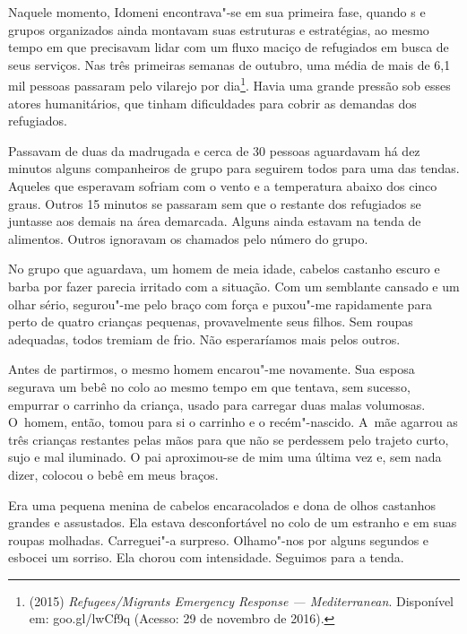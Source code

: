 Naquele momento, Idomeni encontrava"-se em sua primeira fase, quando s
e grupos organizados ainda montavam suas estruturas e estratégias, ao
mesmo tempo em que precisavam lidar com um fluxo maciço de refugiados em
busca de seus serviços. Nas três primeiras semanas de outubro, uma média
de mais de 6,1 mil pessoas passaram pelo vilarejo por
dia\footnote{  (2015) \emph{Refugees/Migrants Emergency
Response --- Mediterranean}. Disponível em:
goo.gl/lwCf9q (Acesso: 29 de
novembro de 2016).}. Havia uma grande pressão sob esses atores
humanitários, que tinham dificuldades para cobrir as demandas dos
refugiados.

Passavam de duas da madrugada e cerca de 30 pessoas aguardavam há dez
minutos alguns companheiros de grupo para seguirem todos para uma 
das tendas. Aqueles que esperavam sofriam com o vento e a
temperatura abaixo dos cinco graus. Outros 15 minutos se passaram sem
que o restante dos refugiados se juntasse aos demais na área demarcada.
Alguns ainda estavam na tenda de alimentos. Outros ignoravam os chamados
pelo número do grupo.

No grupo que aguardava, um homem de meia idade, cabelos castanho escuro
e barba por fazer parecia irritado com a situação. Com um semblante
cansado e um olhar sério, segurou"-me pelo braço com força e puxou"-me
rapidamente para perto de quatro crianças pequenas, provavelmente seus
filhos. Sem roupas adequadas, todos tremiam de frio. Não esperaríamos
mais pelos outros.

Antes de partirmos, o mesmo homem encarou"-me novamente. Sua esposa
segurava um bebê no colo ao mesmo tempo em que tentava, sem sucesso,
empurrar o carrinho da criança, usado para carregar duas malas volumosas.
 O~homem, então, tomou para si o carrinho e o recém"-nascido. A~mãe
agarrou as três crianças restantes pelas mãos para que não se perdessem
pelo trajeto curto, sujo e mal iluminado. O pai aproximou-se de mim uma última 
vez e, sem nada dizer, colocou o bebê em meus braços.

Era uma pequena menina de cabelos encaracolados e dona de olhos castanhos grandes e assustados.
 Ela estava desconfortável no colo de um estranho
e em suas roupas molhadas. Carreguei"-a surpreso. Olhamo"-nos por alguns
segundos e esbocei um sorriso. Ela chorou com intensidade. Seguimos para
a tenda.
